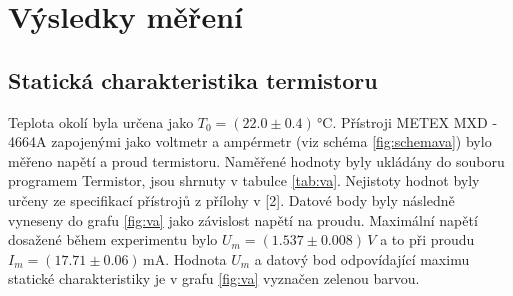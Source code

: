 \documentclass{../concepts/prepareprotokol} %
\begin{document}
\section{Výsledky měření}

\subsection{Statická charakteristika termistoru}

Teplota okolí byla určena jako $T_0 = (22.0 \pm 0.4)\, \si{\celsius}$. Přístroji METEX MXD - 4664A zapojenými jako voltmetr a ampérmetr (viz schéma \ref{fig:schemava}) bylo měřeno napětí a proud termistoru. Naměřené hodnoty byly ukládány do souboru programem Termistor, jsou shrnuty v tabulce \ref{tab:va}. Nejistoty hodnot byly určeny ze specifikací přístrojů z přílohy v [2]. Datové body byly následně vyneseny do grafu \ref{fig:va} jako závislost napětí na proudu. Maximální napětí dosažené během experimentu bylo $U_m = (1.537 \pm 0.008) \, \si{V}$ a to při proudu $I_m = (17.71 \pm 0.06) \, \si{\milli \ampere}$. Hodnota $U_m$ a datový bod odpovídající maximu statické charakteristiky je v grafu \ref{fig:va} vyznačen zelenou barvou.
\end{document}

